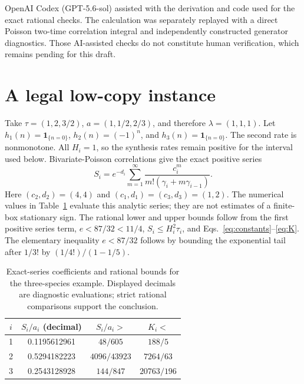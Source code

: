 \documentclass[aps,pre,twocolumn,showpacs,amsmath,amssymb]{revtex4-2}
\begin{document}
OpenAI Codex (GPT-5.6-sol) assisted with the derivation and code used for the exact rational checks. The calculation was separately replayed with a direct Poisson two-time correlation integral and independently constructed generator diagnostics. Those AI-assisted checks do not constitute human verification, which remains pending for this draft.

\section{A legal low-copy instance}
Take $\tau=(1,2,3/2)$, $a=(1,1/2,2/3)$, and therefore $\lambda=(1,1,1)$. Let $h_1(n)=\mathbf1_{\{n=0\}}$, $h_2(n)=(-1)^n$, and $h_3(n)=\mathbf1_{\{n=0\}}$. The second rate is nonmonotone. All $H_i=1$, so the synthesis rates remain positive for the interval used below. Bivariate-Poisson correlations give the exact positive series
\begin{equation}
S_i=e^{-d_i}\sum_{m=1}^\infty
\frac{c_i^m}{m!(\gamma_i+m\gamma_{i-1})}.
\label{eq:series}
\end{equation}
Here $(c_2,d_2)=(4,4)$ and $(c_1,d_1)=(c_3,d_3)=(1,2)$.
The numerical values in Table~\ref{tab:example} evaluate this analytic series; they are not estimates of a finite-box stationary sign. The rational lower and upper bounds follow from the first positive series term, $e<87/32<11/4$, $S_i\leq H_i^2\tau_i$, and Eqs.~\eqref{eq:constants}--\eqref{eq:K}. The elementary inequality $e<87/32$ follows by bounding the exponential tail after $1/3!$ by $(1/4!)/(1-1/5)$.

\begin{table}[t]
\caption{Exact-series coefficients and rational bounds for the three-species example. Displayed decimals are diagnostic evaluations; strict rational comparisons support the conclusion.}
\label{tab:example}
\begin{ruledtabular}
\begin{tabular}{cccc}
$i$ & $S_i/a_i$ (decimal) & $S_i/a_i>$ & $K_i<$\\
\hline
1 & 0.1195612961 & $48/605$ & $188/5$\\
2 & 0.5294182223 & $4096/43923$ & $7264/63$\\
3 & 0.2543128928 & $144/847$ & $20763/196$\\
\end{tabular}
\end{ruledtabular}
\end{table}
\end{document}
